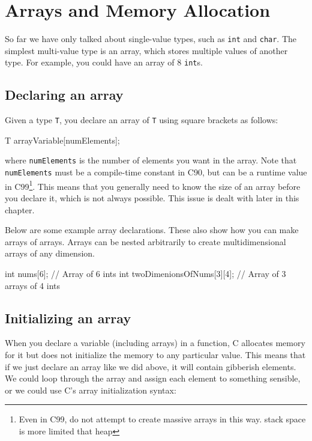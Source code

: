 
\chapter{Arrays and Memory Allocation}

So far we have only talked about single-value types, such as \texttt{int} and \texttt{char}.
The simplest multi-value type is an array, which stores multiple values of another type.
For example, you could have an array of 8 \texttt{int}s.

\section{Declaring an array}

Given a type \texttt{T}, you declare an array of \texttt{T} using square brackets as follows:
\begin{codeinline}
T arrayVariable[numElements];
\end{codeinline}
where \texttt{numElements} is the number of elements you want in the array.
Note that \texttt{numElements} must be a compile-time constant in C90, but can be a runtime value in C99\footnote{Even in C99, do not attempt to create massive arrays in this way.
stack space is more limited that heap}.
This means that you generally need to know the size of an array before you declare it, which is not always possible.
This issue is dealt with later in this chapter.

Below are some example array declarations.
These also show how you can make arrays of arrays.
Arrays can be nested arbitrarily to create multidimensional arrays of any dimension.

\begin{codeblock}
int nums[6]; // Array of 6 ints
int twoDimenionsOfNums[3][4]; // Array of 3 arrays of 4 ints
\end{codeblock}

\section{Initializing an array}

When you declare a variable (including arrays) in a function, C allocates memory for it but does not initialize the memory to any particular value.
This means that if we just declare an array like we did above, it will contain gibberish elements.
We could loop through the array and assign each element to something sensible, or we could use C's array initialization syntax:

